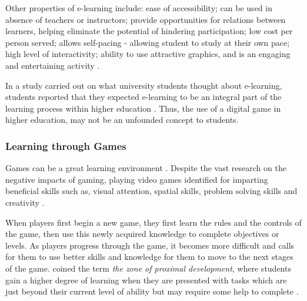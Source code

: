 \documentclass[a4paper,11.5pt]{report}
\numberwithin{figure}{section}
\numberwithin{table}{section}
\numberwithin{equation}{section}
\numberwithin{equation}{section}
\begin{document}
Other properties of e-learning include: ease of accessibility; can be used in absence of teachers or instructors; provide opportunities for relations between learners, helping eliminate the potential of hindering participation; low cost per person served; allows self-pacing - allowing student to study at their own pace; high level of interactivity; ability to use attractive graphics, and is an engaging and entertaining activity \citep{arkorful2015, Girard2013}.

In a study carried out on what university students thought about e-learning, students reported that they expected e-learning to be an integral part of the learning process within higher education \citep{Connolly2012}. Thus, the use of a digital game in higher education, may not be an unfounded concept to students.



\subsubsection{Learning through Games}


Games can be a great learning environment \citep[see][]{prensky2003, Gee2003}. Despite the vast research on the negative impacts of gaming, playing video games identified for imparting beneficial skills such as, visual attention, spatial skills, problem solving skills and creativity \citep{Granic2014}. 

When players first begin a new game, they first learn the rules and the controls of the game, then use this newly acquired knowledge to complete objectives or levels. As players progress through the game, it becomes more difficult and calls for them to use better skills and knowledge for them to move to the next stages of the game. \citeauthor{vygotsky1978} coined the term \textit{the zone of proximal development}, where students gain a higher degree of learning when they are presented with tasks which are just beyond their current level of ability but may require some help to complete \citep{vygotsky1978}.
\end{document}
